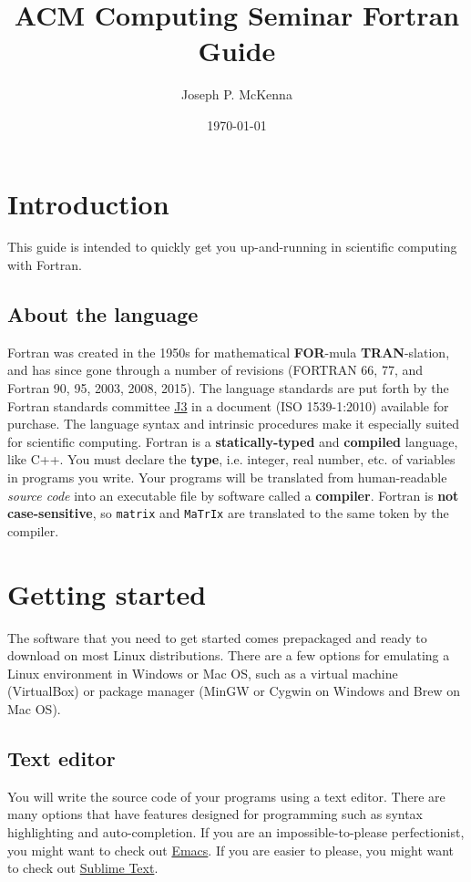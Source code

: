 \documentclass[11pt]{article}
\author{Joseph P. McKenna}
\date{\today}
\title{ACM Computing Seminar Fortran Guide}
\begin{document}
\maketitle
\tableofcontents


\section{Introduction}
\label{sec:orgheadline2}
This guide is intended to quickly get you up-and-running in scientific computing with Fortran. 
\subsection{About the language}
\label{sec:orgheadline1}
Fortran was created in the 1950s for mathematical \textbf{FOR}-mula \textbf{TRAN}-slation, and has since gone through a number of revisions (FORTRAN 66, 77, and Fortran 90, 95, 2003, 2008, 2015). The language standards are put forth by the Fortran standards committee \href{http://www.j3-fortran.org}{J3} in a document (ISO 1539-1:2010) available for purchase. The language syntax and intrinsic procedures make it especially suited for scientific computing. Fortran is a \textbf{statically-typed} and \textbf{compiled} language, like C++. You must declare the \textbf{type}, i.e. integer, real number, etc. of variables in programs you write. Your programs will be translated from human-readable \emph{source code} into an executable file by software called a \textbf{compiler}. Fortran is \textbf{not case-sensitive}, so \texttt{matrix} and \texttt{MaTrIx} are translated to the same token by the compiler.

\section{Getting started}
\label{sec:orgheadline9}
The software that you need to get started comes prepackaged and ready to download on most Linux distributions. There are a few options for emulating a Linux environment in Windows or Mac OS, such as a virtual machine (VirtualBox) or package manager (MinGW or Cygwin on Windows and Brew on Mac OS).
\subsection{Text editor}
\label{sec:orgheadline3}
You will write the source code of your programs using a text editor. There are many options that have features designed for programming such as syntax highlighting and auto-completion. If you are an impossible-to-please perfectionist, you might want to check out \href{https://www.gnu.org/s/emacs/}{Emacs}. If you are easier to please, you might want to check out \href{https://www.sublimetext.com/}{Sublime Text}.
\end{document}
